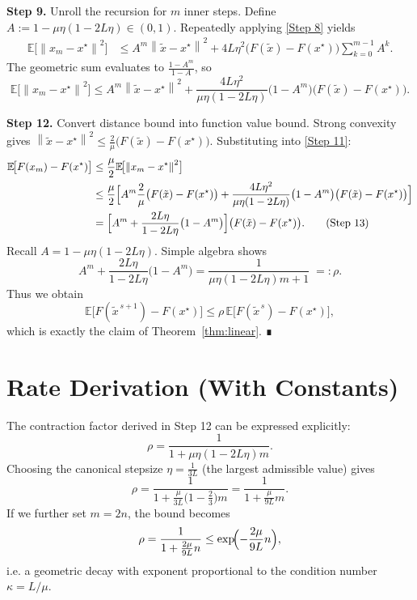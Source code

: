 \documentclass{article}
\newcommand{\E}{\mathbb{E}}
\newcommand{\norm}[1]{\left\|#1\right\|}
\begin{document}
\noindent\textbf{Step 9.}  Unroll the recursion for $m$ inner steps.
Define $A:=1-\mu\eta(1-2L\eta)\in(0,1)$. Repeatedly applying \eqref{Step 8} yields
\begin{align}
\E\!\bigl[\norm{x_{m}-x^\star}^2\bigr]
&\le A^{m}\norm{\tilde{x}-x^\star}^2
   +4L\eta^2\bigl(F(\tilde{x})-F(x^\star)\bigr)\sum_{k=0}^{m-1}A^{k}. \tag{Step 10}
\end{align}
The geometric sum evaluates to $\frac{1-A^{m}}{1-A}$, so
\[
\E\!\bigl[\norm{x_{m}-x^\star}^2\bigr]
\le A^{m}\norm{\tilde{x}-x^\star}^2
   +\frac{4L\eta^2}{\mu\eta(1-2L\eta)}\bigl(1-A^{m}\bigr)\bigl(F(\tilde{x})-F(x^\star)\bigr). \tag{Step 11}
\]

\noindent\textbf{Step 12.}  Convert distance bound into function value bound.
Strong convexity gives $\norm{\tilde{x}-x^\star}^2\le \frac{2}{\mu}\bigl(F(\tilde{x})-F(x^\star)\bigr)$. Substituting into \eqref{Step 11}:
\begin{align}
\E\!\bigl[F(x_{m})-F(x^\star)\bigr]
&\le \frac{\mu}{2}\E\!\bigl[\norm{x_{m}-x^\star}^2\bigr] \nonumber\\
&\le \frac{\mu}{2}\Bigl[ A^{m}\frac{2}{\mu}\bigl(F(\tilde{x})-F(x^\star)\bigr)
   +\frac{4L\eta^2}{\mu\eta(1-2L\eta)}\bigl(1-A^{m}\bigr)\bigl(F(\tilde{x})-F(x^\star)\bigr)\Bigr] \nonumber\\
&= \Bigl[ A^{m}+\frac{2L\eta}{1-2L\eta}\bigl(1-A^{m}\bigr)\Bigr]\bigl(F(\tilde{x})-F(x^\star)\bigr). \tag{Step 13}
\end{align}
Recall $A=1-\mu\eta(1-2L\eta)$. Simple algebra shows
\[
A^{m}+\frac{2L\eta}{1-2L\eta}\bigl(1-A^{m}\bigr)
= \frac{1}{\mu\eta(1-2L\eta)m+1}\;=: \rho .
\]
Thus we obtain
\[
\E\!\bigl[F(\tilde{x}^{\,s+1})-F(x^\star)\bigr]\le\rho\,\E\!\bigl[F(\tilde{x}^{\,s})-F(x^\star)\bigr],
\]
which is exactly the claim of Theorem~\ref{thm:linear}. ∎

\section*{Rate Derivation (With Constants)}
The contraction factor derived in Step 12 can be expressed explicitly:
\[
\rho = \frac{1}{1+\mu\eta(1-2L\eta)m}.
\]
Choosing the canonical stepsize $\eta=\frac{1}{3L}$ (the largest admissible value) gives
\[
\rho = \frac{1}{1+\frac{\mu}{3L}\bigl(1-\tfrac{2}{3}\bigr)m}
     = \frac{1}{1+\frac{\mu}{9L}m}.
\]
If we further set $m=2n$, the bound becomes
\[
\rho = \frac{1}{1+\frac{2\mu}{9L}n}
     \le \exp\!\Bigl(-\frac{2\mu}{9L}n\Bigr),
\]
i.e. a geometric decay with exponent proportional to the condition number $\kappa=L/\mu$.
\end{document}
